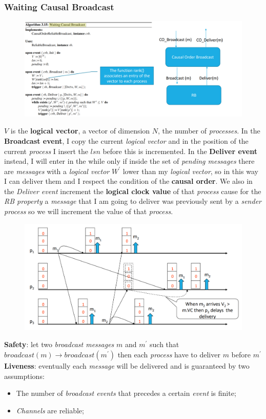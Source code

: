 \documentclass{article}
\begin{document}
\subsubsection{Waiting Causal Broadcast}
\begin{figure}[H]
  \centering
  \includegraphics[scale=0.7,left]{cattura52.png}
\end{figure}
$V$ is the \textbf{logical vector}, a vector of dimension $N$, the number of \emph{processes}. In the \textbf{Broadcast event}, I copy the current \emph{logical vector} and in the position of the current \emph{process} I insert the $lsn$ before this is incremented. In the \textbf{Deliver event} instead, I will enter in the while only if inside the set of \emph{pending messages} there are \emph{messages} with a \emph{logical vector} $W^{'}$ lower than my \emph{logical vector}, so in this way I can deliver them and I respect the condition of the \textbf{causal order}. We also in the \emph{Deliver event} increment the \textbf{logical clock value} of that \emph{process} cause for the \emph{RB property} a \emph{message} that I am going to deliver was previously sent by a \emph{sender process} so we will increment the value of that \emph{process}. 
\begin{figure}[H]
  \centering
  \includegraphics[scale=0.45]{cattura53.png}
\end{figure}
\hfill \break
\textbf{Safety}: let two \emph{broadcast messages} $m$ and $m^{'}$ such that $broadcast(m) \rightarrow broadcast(m^{'})$ then each \emph{process} have to deliver $m$ before $m^{'}$\\
\textbf{Liveness}: eventually each \emph{message} will be delivered and is guaranteed by two assumptions:
\begin{itemize}
\item The number of \emph{broadcast events} that precedes a certain \emph{event} is finite;
\item \emph{Channels} are reliable;
\end{itemize}
\end{document}
